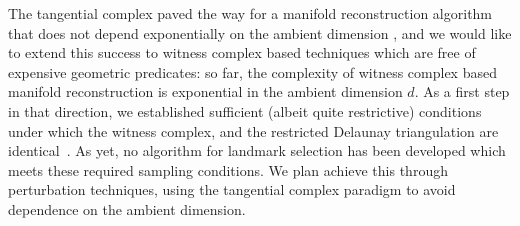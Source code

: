 %
The tangential complex paved the way for a manifold reconstruction
algorithm that does not depend exponentially on the ambient dimension
\cite{geometrica-7142i}, 
and we would like to extend this success to witness complex based
techniques which are free of expensive geometric predicates:
%
so far, the complexity of witness complex
based manifold reconstruction is exponential in the ambient dimension
$d$.
As a first step in that direction, we established sufficient (albeit
quite restrictive) conditions under which the witness complex, and the
restricted Delaunay triangulation are
identical~\cite{boissonnat2011cgl}.
%
As yet, no algorithm for landmark selection has been developed which
meets these required sampling conditions.  We plan achieve this
through perturbation techniques, using the tangential complex paradigm
to avoid dependence on the ambient dimension.




